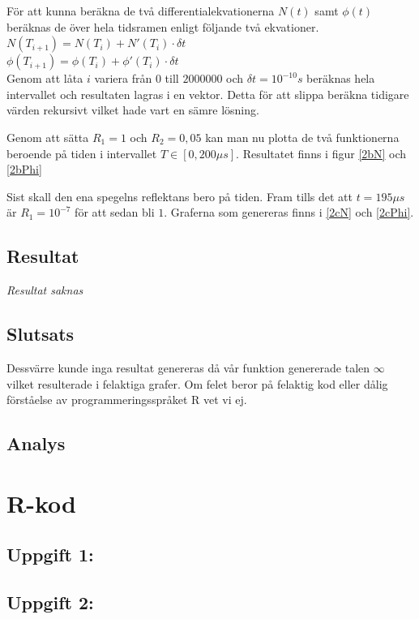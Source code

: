 \documentclass[12pt]{article}
\begin{document}
För att kunna beräkna de två differentialekvationerna $N(t)$ samt $\phi(t)$ beräknas de över hela tidsramen enligt följande två ekvationer.\\
$N(T_{i+1})=N(T_i)+N'(T_i) \cdot \delta t $\\
$\phi(T_{i+1})=\phi(T_i)+\phi'(T_i) \cdot \delta t $\\

Genom att låta $i$ variera från $0$ till $2000000$ och $\delta t=10^{-10}s$ beräknas hela intervallet och resultaten lagras i en vektor. Detta för att slippa beräkna tidigare värden rekursivt vilket hade vart en sämre lösning.

Genom att sätta $R_1 = 1$ och $R_2 = 0,05$ kan man nu plotta de två funktionerna beroende på tiden i intervallet $T \in [0,200 \mu s]$. Resultatet finns i figur \ref{2bN} och \ref{2bPhi} 

Sist skall den ena spegelns reflektans bero på tiden. Fram tills det att $t=195 \mu s$ är $R_1=10^{-7}$ för att sedan bli $1$. Graferna som genereras finns i \ref{2cN} och \ref{2cPhi}.

\subsection{Resultat}
\textit{Resultat saknas}
\subsection{Slutsats}
Dessvärre kunde inga resultat genereras då vår funktion genererade talen $\infty$ vilket resulterade i felaktiga grafer. Om felet beror på felaktig kod eller dålig förståelse av programmeringsspråket R vet vi ej.

\subsection{Analys}


\newpage
\appendix
\section{R-kod}
\subsection{Uppgift 1:}

\newpage
\subsection{Uppgift 2: }

\end{document}
